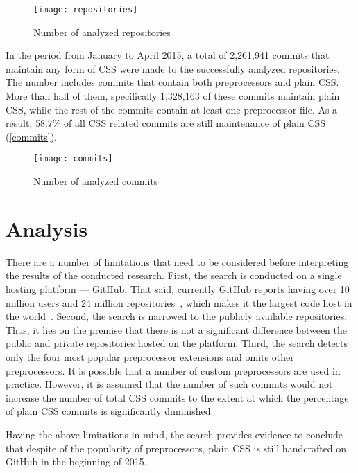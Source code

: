 \begin{figure}[h!]
  \centering
  \caption{
  	\label{repositories}
  	Number of analyzed repositories}
  \texttt{[image: repositories]}
\end{figure}

In the period from January to April 2015, a total of 2,261,941 commits that maintain
any form of CSS were made to the successfully analyzed repositories. The
number includes commits that contain both preprocessors and plain CSS. More
than half of them, specifically 1,328,163 of these commits maintain plain CSS,
while the rest of the commits contain at least one preprocessor file. As a
result, 58.7\% of all CSS related commits are still maintenance of plain CSS
(\autoref{commits}).

\begin{figure}[h!]
  \centering
  \caption{
  	\label{commits}
  	Number of analyzed commits}
  \texttt{[image: commits]}
\end{figure}

\section{Analysis}

There are a number of limitations that need to be considered before
interpreting the results of the conducted research. First, the search is
conducted on a single hosting platform --- GitHub. That said, currently GitHub
reports having over 10 million users and 24 million
repositories~\cite{GitHub}, which makes it the largest code host in the
world~\cite{gousios2014lean}. Second, the search is narrowed to the publicly
available repositories. Thus, it lies on the premise that there is not a
significant difference between the public and private repositories hosted on
the platform. Third, the search detects only the four most popular
preprocessor extensions and omits other preprocessors. It is possible that a
number of custom preprocessors are used in practice. However, it is assumed
that the number of such commits would not increase the number of total CSS
commits to the extent at which the percentage of plain CSS commits is
significantly diminished.

Having the above limitations in mind, the search provides evidence to conclude
that despite of the popularity of preprocessors, plain CSS is still
handcrafted on GitHub in the beginning of 2015.

